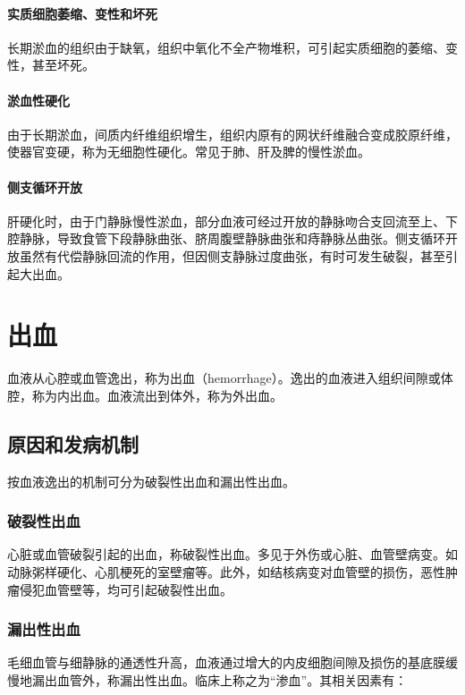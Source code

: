 \paragraph{实质细胞萎缩、变性和坏死}
长期淤血的组织由于缺氧，组织中氧化不全产物堆积，可引起实质细胞的萎缩、变性，甚至坏死。

\paragraph{淤血性硬化}
由于长期淤血，间质内纤维组织增生，组织内原有的网状纤维融合变成胶原纤维，使器官变硬，称为无细胞性硬化。常见于肺、肝及脾的慢性淤血。

\paragraph{侧支循环开放}
肝硬化时，由于门静脉慢性淤血，部分血液可经过开放的静脉吻合支回流至上、下腔静脉，导致食管下段静脉曲张、脐周腹壁静脉曲张和痔静脉丛曲张。侧支循环开放虽然有代偿静脉回流的作用，但因侧支静脉过度曲张，有时可发生破裂，甚至引起大出血。

\section{出血}

血液从心腔或血管逸出，称为出血（hemorrhage）。逸出的血液进入组织间隙或体腔，称为内出血。血液流出到体外，称为外出血。

\subsection{原因和发病机制}

按血液逸出的机制可分为破裂性出血和漏出性出血。

\subsubsection{破裂性出血}

心脏或血管破裂引起的出血，称破裂性出血。多见于外伤或心脏、血管壁病变。如动脉粥样硬化、心肌梗死的室壁瘤等。此外，如结核病变对血管壁的损伤，恶性肿瘤侵犯血管壁等，均可引起破裂性出血。

\subsubsection{漏出性出血}

毛细血管与细静脉的通透性升高，血液通过增大的内皮细胞间隙及损伤的基底膜缓慢地漏出血管外，称漏出性出血。临床上称之为“渗血”。其相关因素有：


